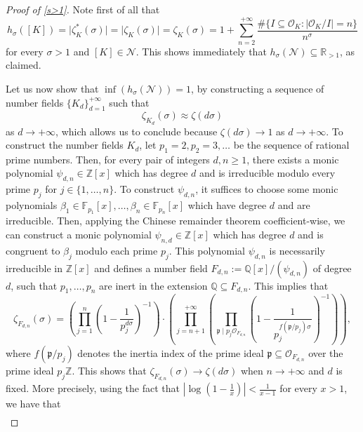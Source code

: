 \documentclass[10pt,a4paper]{amsart}
\theoremstyle{plain}
\theoremstyle{definition}
\theoremstyle{remark}
\begin{document}
    \begin{proof}[Proof of \cref{s>1}]
        Note first of all that
        \[
            h_\sigma([K]) = \lvert \zeta_K^\ast(\sigma) \rvert = \lvert \zeta_K(\sigma) \rvert = \zeta_K(\sigma) = 1 + \sum_{n=2}^{+\infty} \frac{\# \{ I \subseteq \mathcal{O}_K \colon \lvert \mathcal{O}_K/I \rvert = n \}}{n^\sigma}
        \]
        for every $\sigma > 1$ and $[K] \in \mathcal{N}$. This shows immediately that $h_\sigma(\mathcal{N}) \subseteq \mathbb{R}_{> 1}$, as claimed.

        Let us now show that $\inf(h_\sigma(\mathcal{N})) = 1$, by constructing a sequence of number fields $\{ K_d \}_{d=1}^{+\infty}$ such that \[\zeta_{K_d}(\sigma) \approx \zeta(d \sigma)\] as $d \to +\infty$, which allows us to conclude because $\zeta(d \sigma) \to 1$ as $d \to +\infty$. 
        To construct the number fields $K_d$, let $p_1 = 2, p_2 = 3,\dots$ be the sequence of rational prime numbers. Then, for every pair of integers $d,n \geq 1$, there exists a monic polynomial $\psi_{d,n} \in \mathbb{Z}[x]$ which has degree $d$ and is irreducible modulo every prime $p_j$ for $j \in \{1,\dots,n\}$. To construct $\psi_{d,n}$, it suffices to choose some monic polynomials $\beta_1 \in \mathbb{F}_{p_1}[x],\dots,\beta_n \in \mathbb{F}_{p_n}[x]$ which have degree $d$ and are irreducible. Then, applying the Chinese remainder theorem coefficient-wise, we can construct a monic polynomial $\psi_{n,d} \in \mathbb{Z}[x]$ which has degree $d$ and is congruent to $\beta_j$ modulo each prime $p_j$. This polynomial $\psi_{d,n}$ is necessarily irreducible in $\mathbb{Z}[x]$ and defines a number field $F_{d,n} := \mathbb{Q}[x]/(\psi_{d,n})$ of degree $d$, such that $p_1,\dots,p_n$ are inert in the extension $\mathbb{Q} \subseteq F_{d,n}$. This implies that
        \[
            \zeta_{F_{d,n}}(\sigma) = \left( \prod_{j=1}^n \left( 1 - \frac{1}{p_j^{d \sigma}} \right)^{-1} \right) \cdot \left( \prod_{j= n+1}^{+\infty} \left( \prod_{\mathfrak{p} \mid p_j \mathcal{O}_{F_{d,n}}}  \left( 1 - \frac{1}{p_j^{f(\mathfrak{p}/p_j) \sigma}} \right)^{-1} \right) \right),
        \]
        where $f(\mathfrak{p}/p_j)$ denotes the inertia index of the prime ideal $\mathfrak{p} \subseteq \mathcal{O}_{F_{d,n}}$ over the prime ideal $p_j \mathbb{Z}$. This shows that $\zeta_{F_{d,n}}(\sigma) \to \zeta(d \sigma)$ when $n \to +\infty$ and $d$ is fixed. 
        More precisely, using the fact that $\left\lvert \log\left( 1 - \frac{1}{x} \right) \right\rvert < \frac{1}{x-1}$ for every $x > 1$, we have that
        \[
            \begin{aligned}

\end{aligned}\]
\end{proof}
\end{document}
